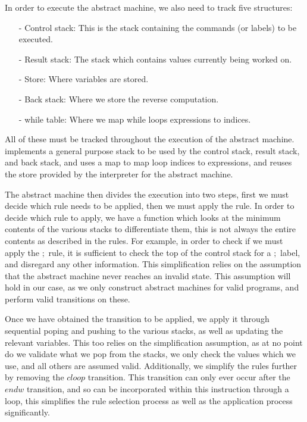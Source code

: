 In order to execute the abstract machine, we also need to track five structures:
\begin{enumerate}
    \item[-] Control stack: This is the stack containing the commands (or labels) to be executed.
    \item[-] Result stack: The stack which contains values currently being worked on.
    \item[-] Store: Where variables are stored.
    \item[-] Back stack: Where we store the reverse computation.
    \item[-] while table: Where we map while loops expressions to indices.
\end{enumerate}

All of these must be tracked throughout the execution of the abstract machine. \rimp implements a general purpose stack to be used by the control stack, result stack, and back stack, and uses a map to map loop indices to expressions, and reuses the store provided by the interpreter for the abstract machine.

The abstract machine then divides the execution into two steps, first we must decide which rule needs to be applied, then we must apply the rule.
In order to decide which rule to apply, we have a function which looks at the minimum contents of the various stacks to differentiate them, this is not always the entire contents as described in the rules. For example, in order to check if we must apply the $;$ rule, it is sufficient to check the top of the control stack for a $;$ label, and disregard any other information. 
This simplification relies on the assumption that the abstract machine never reaches an invalid state. This assumption will hold in our case, as we only construct abstract machines for valid \rimplang programs, and perform valid transitions on these.

Once we have obtained the transition to be applied, we apply it through sequential poping and pushing to the various stacks, as well as updating the relevant variables. This too relies on the simplification assumption, as at no point do we validate what we pop from the stacks, we only check the values which we use, and all others are assumed valid.
Additionally, we simplify the rules further by removing the $cloop$ transition. This transition can only ever occur after the $endw$ transition, and so can be incorporated within this instruction through a loop, this simplifies the rule selection process as well as the application process significantly.

